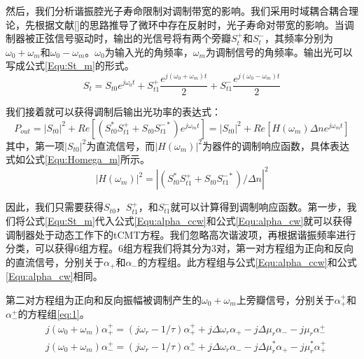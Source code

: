 然后，我们分析谐振腔光子寿命限制对调制带宽的影响。我们采用时域耦合耦合理论，先根据文献[]的思路推导了微环中存在反射时，光子寿命对带宽的影响。当调制器被正弦信号驱动时，输出的光信号将有两个旁瓣$S_{t}^+$和$S_{t}^-$，其频率分别为$\omega_0+\omega_m$和$\omega_0-\omega_m$。$\omega_0$为输入光的角频率，$\omega_m$为调制信号的角频率。输出光可以写成公式\ref{Equ:St_m}的形式。
\begin{equation}
\label{Equ:St_m}
S_t = S_{t0}e^{j\omega_0t}+S_{t1}^+\frac{e^{j(\omega_0+\omega_m)t}}{2}+S_{t1}^-\frac{e^{j(\omega_0-\omega_m)t}}{2}
\end{equation}

我们接着就可以获得调制后输出光功率的表达式：
\begin{equation}
\label{Equ:Pout_m}
P_{out} = |S_{t0}|^2+Re\left[(S_{t0}^*S_{t1}^{+}+S_{t0}S_{t1}^{-*})e^{j\omega_mt} \right]=|S_{t0}|^2+Re\left[H(\omega_m)\Delta n e^{j\omega_mt}\right]
\end{equation}
其中，第一项$|S_{t0}|^2$为直流信号，而$|H(\omega_m)|^2$为器件的调制响应函数，具体表达式如公式\ref{Equ:Homega_m}所示。
\begin{equation}
\label{Equ:Homega_m}
 |H(\omega_m)|^2 = |(S_{t0}^*S_{t1}^{+}+S_{t0}S_{t1}^{-*})/\Delta n|^2 
\end{equation}

因此，我们只需要获得$S_{t0}$，$S_{t1}^+$，和$S_{t1}^-$就可以计算得到调制响应函数。第一步，我们将公式\ref{Equ:St_m}代入公式\ref{Equ:alpha_ccw}和公式\ref{Equ:alpha_cw}就可以获得调制器处于动态工作下的tCMT方程。我们忽略高次谐波项，再根据谐振频率进行分类，可以获得6组方程。6组方程我们将其分为3对，第一对方程组为正向和反向的直流信号，分别关于$\alpha_+$和$\alpha_-$的方程组。此方程组与公式\ref{Equ:alpha_ccw}和公式\ref{Equ:alpha_cw}相同。

第二对方程组为正向和反向振幅被调制产生的$\omega_0+\omega_m$上旁瓣信号，分别关于$\alpha_+^+$和$\alpha_-^+$的方程组\ref{eq:1}。
\begin{subequations}  \label{eq:1}
	\begin{align}  
	&j(\omega_0+\omega_m)\alpha_+^+ = (j\omega_r-1/\tau)\alpha_+^+ +j\Delta \omega_r\alpha_+ - j\Delta \mu_r\alpha_- - j\mu_r\alpha_-^+            \label{eq:1A} \\
	&j(\omega_0+\omega_m)\alpha_-^+ = (j\omega_r-1/\tau)\alpha_-^+ +j\Delta \omega_r\alpha_- - j\Delta \mu_r^*\alpha_+ - j\mu_r^*\alpha_+^+           \label{eq:1B}
	\end{align}
\end{subequations}


